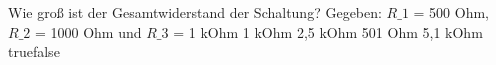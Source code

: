     {Wie groß ist der Gesamtwiderstand der Schaltung? Gegeben: $R\_1$ = 500 Ohm, $R\_2$ = 1000 Ohm und $R\_3$ = 1 kOhm}
    {1 kOhm}
    {2,5 kOhm}
    {501 Ohm}
    {5,1 kOhm}
    {true}{false}